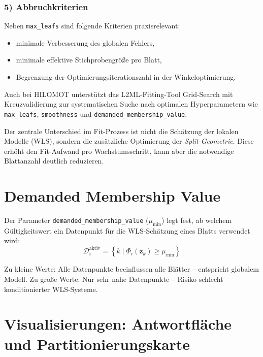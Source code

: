 \documentclass[11pt,a4paper]{report}
\begin{document}
\subsubsection{5) Abbruchkriterien}
Neben \texttt{max\_leafs} sind folgende Kriterien praxisrelevant:
\begin{itemize}
\item minimale Verbesserung des globalen Fehlers,
\item minimale effektive Stichprobengr\"{o}\ss{}e pro Blatt,
\item Begrenzung der Optimierungsiterationszahl in der Winkeloptimierung.
\end{itemize}
Auch bei HILOMOT unterst\"{u}tzt das L2ML-Fitting-Tool Grid-Search mit Kreuzvalidierung zur
systematischen Suche nach optimalen Hyperparametern wie \texttt{max\_leafs},
\texttt{smoothness} und \texttt{demanded\_membership\_value}.

\begin{merkbox}
Der zentrale Unterschied im Fit-Prozess ist nicht die Sch\"{a}tzung der lokalen Modelle
(WLS), sondern die zus\"{a}tzliche Optimierung der \emph{Split-Geometrie}. Diese erh\"{o}ht
den Fit-Aufwand pro Wachstumsschritt, kann aber die notwendige Blattanzahl deutlich
reduzieren.
\end{merkbox}

\section{Demanded Membership Value}

Der Parameter \texttt{demanded\_membership\_value} ($\mu_{\min}$) legt fest, ab welchem
G\"{u}ltigkeitswert ein Datenpunkt f\"{u}r die WLS-Sch\"{a}tzung eines Blatts verwendet wird:
\begin{equation}
\mathcal{D}_i^{\text{aktiv}} = \left\{ k \mid \Phi_i(\mathbf{z}_k) \geq \mu_{\min} \right\}
\end{equation}

Zu kleine Werte: Alle Datenpunkte beeinflussen alle Bl\"{a}tter -- entspricht globalem Modell.
Zu gro\ss{}e Werte: Nur sehr nahe Datenpunkte -- Risiko schlecht konditionierter WLS-Systeme.

\section{Visualisierungen: Antwortfl\"{a}che und Partitionierungskarte}
\end{document}
